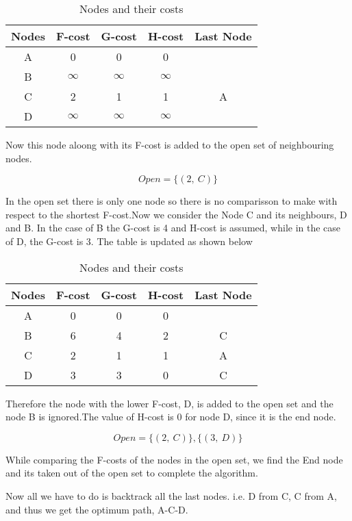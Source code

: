 \begin{table}[H]
\centering
    \begin{tabular}{ |c|c|c|c|c| } 
    \hline
    Nodes & F-cost & G-cost & H-cost & Last Node \\
    \hline 
    A & 0 & 0 & 0 &\\ 
    B & $\infty$ & $\infty$ & $\infty$ &\\ 
    C & 2 & 1 & 1 & A\\ 
    D & $\infty$ & $\infty$ & $\infty$ &\\
    \hline
    \end{tabular}
    \caption{Nodes and their costs}
    \label{table:nodeCost1}
\end{table}

Now this node aloong with its F-cost is added to the open set of neighbouring nodes.

\[Open = \{(2, \ C)\}\]

In the open set there is only one node so there is no comparisson to make with respect to the shortest F-cost.Now we consider the Node C and its neighbours, D and B. In the case of B the G-cost is 4 and H-cost is assumed, while in the case of D, the G-cost is 3. 
    The table is updated as shown below

\begin{table}[H]
\centering
    \begin{tabular}{ |c|c|c|c|c| } 
    \hline
    Nodes & F-cost & G-cost & H-cost & Last Node \\
    \hline     
    A & 0 & 0 & 0 &\\ 
    B & 6 & 4 & 2 & C\\ 
    C & 2 & 1 & 1 & A\\ 
    D & 3 & 3 & 0 & C\\
    \hline
    \end{tabular}
    \caption{Nodes and their costs}
    \label{table:nodeCost2}
\end{table}

Therefore the node with the lower F-cost, D, is added to the open set and the node B is ignored.The value of H-cost is 0 for node D, since it is the end node.

\[Open = \{(2, \ C)\}, \{(3, \ D)\}\]

While comparing the F-costs of the nodes in the open set, we find the End node and its taken out of the open set to complete the algorithm.

Now all we have to do is backtrack all the last nodes. i.e. D from C, C from A, and thus we get the optimum path, A-C-D.

